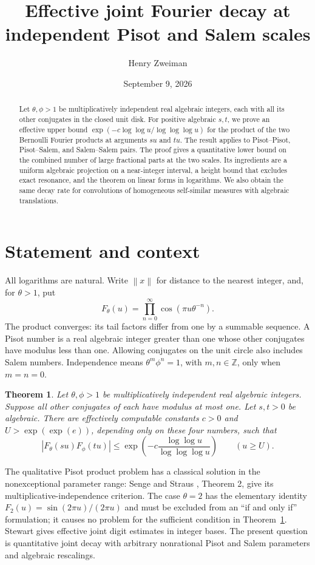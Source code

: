 \documentclass[11pt]{article}
\title{Effective joint Fourier decay at independent Pisot and Salem scales}
\author{Henry Zweiman}
\date{September 9, 2026}
\newtheorem{theorem}{Theorem}
\newcommand{\Z}{\mathbb Z}
\newcommand{\dist}[1]{\left\|#1\right\|}
\begin{document}
\maketitle
\begin{abstract}
Let $\theta,\phi>1$ be multiplicatively independent real algebraic
integers, each with all its other conjugates in the closed unit disk.
For positive algebraic $s,t$, we prove an effective upper bound
$\exp(-c\log\log u/\log\log\log u)$ for the product of the two
Bernoulli Fourier products at arguments $su$ and $tu$.
The result applies to Pisot--Pisot, Pisot--Salem, and Salem--Salem pairs.
The proof gives a quantitative lower bound on the combined number of
large fractional parts at the two scales. Its ingredients are a uniform
algebraic projection on a near-integer interval, a height bound that
excludes exact resonance, and the theorem on linear forms in logarithms.
We also obtain the same decay rate for convolutions of homogeneous
self-similar measures with algebraic translations.
\end{abstract}

\section{Statement and context}
All logarithms are natural. Write $\dist{x}$ for distance to the nearest
integer, and, for $\theta>1$, put
\[
 F_\theta(u)=\prod_{n=0}^{\infty}\cos(\pi u\theta^{-n}).
\]
The product converges: its tail factors differ from one by a summable
sequence. A Pisot number is a real algebraic integer greater than one
whose other conjugates have modulus less than one. Allowing conjugates
on the unit circle also includes Salem numbers. Independence means
$\theta^m\phi^n=1$, with $m,n\in\Z$, only when $m=n=0$.

\begin{theorem}\label{thm:main}
Let $\theta,\phi>1$ be multiplicatively independent real algebraic
integers. Suppose all other conjugates of each have modulus at most one.
Let $s,t>0$ be algebraic. There are effectively computable constants
$c>0$ and $U>\exp(\exp(e))$, depending only on these four numbers, such that
\begin{equation}\label{eq:main}
 |F_\theta(su)F_\phi(tu)|
 \leq \exp\left(-c\frac{\log\log u}{\log\log\log u}\right)
 \qquad(u\geq U).
\end{equation}
\end{theorem}

The qualitative Pisot product problem has a classical solution in the
nonexceptional parameter range: Senge and Straus \cite{SS}, Theorem 2,
give its multiplicative-independence criterion. The case $\theta=2$ has
the elementary identity $F_2(u)=\sin(2\pi u)/(2\pi u)$ and must be
excluded from an ``if and only if'' formulation; it causes no problem
for the sufficient condition in Theorem~\ref{thm:main}.
Stewart \cite{Stewart} gives effective joint digit estimates in integer
bases. The present question is quantitative joint decay with arbitrary
nonrational Pisot and Salem parameters and algebraic rescalings.
\end{document}
